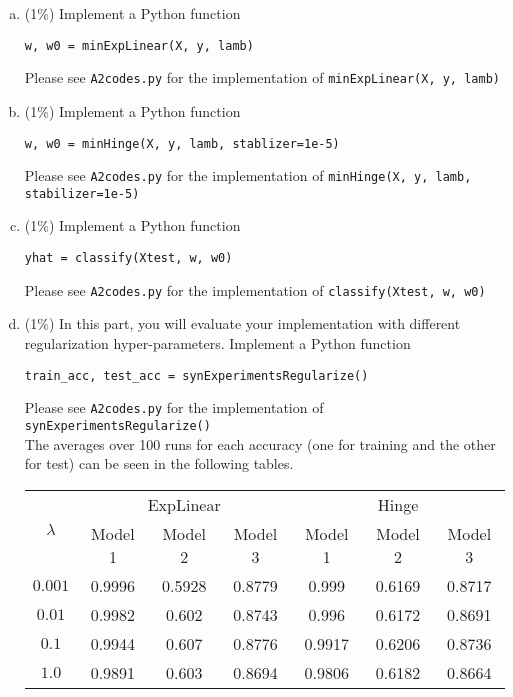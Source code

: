 \documentclass[12pt]{article}
\begin{document}
\begin{enumerate}[(a)]
  \item (1\%) Implement a Python function 
    \begin{center}
      \texttt{w, w0 = minExpLinear(X, y, lamb)}
    \end{center}
    Please see \texttt{A2codes.py} for the implementation of \texttt{minExpLinear(X, y, lamb)}
  \item (1\%) Implement a Python function
    \begin{center}
      \texttt{w, w0 = minHinge(X, y, lamb, stablizer=1e-5)}
    \end{center}
    Please see \texttt{A2codes.py} for the implementation of \texttt{minHinge(X, y, lamb, stabilizer=1e-5)}
  \item (1\%) Implement a Python function 
    \begin{center}
      \texttt{yhat = classify(Xtest, w, w0)}\\
    \end{center}
    Please see \texttt{A2codes.py} for the implementation of \texttt{classify(Xtest, w, w0)}
  \item (1\%) In this part, you will evaluate your implementation with different regularization hyper-parameters. Implement a Python function 
    \begin{center}
      \texttt{train\_acc, test\_acc = synExperimentsRegularize()}
    \end{center}
    Please see \texttt{A2codes.py} for the implementation of \texttt{synExperimentsRegularize()} \\
    The averages over 100 runs for each accuracy (one for training and the other for test) can be seen in the following tables. 
    \begin{table}[H]
      \centering
      \begin{tabular}{|c|c|c|c|c|c|c|}
        \hline
        \multirow{2}{25mm}{\centering$\lambda$} & \multicolumn{3}{|c|}{ExpLinear} & \multicolumn{3}{|c|}{Hinge} \\ 
        \cline{2-7}
        & Model 1 & Model 2 & Model 3 & Model 1 & Model 2 & Model 3 \\ 
        \hline
        $0.001$ & 0.9996 & 0.5928 & 0.8779 & 0.999 & 0.6169 & 0.8717\\ 
        $0.01$ & 0.9982 & 0.602 & 0.8743 & 0.996 & 0.6172 & 0.8691\\ 
        $0.1$ & 0.9944 & 0.607 & 0.8776 & 0.9917 & 0.6206 & 0.8736\\ 
        $1.0$ & 0.9891 & 0.603 & 0.8694 & 0.9806 & 0.6182 & 0.8664\\ 

\end{tabular}
\end{table}
\end{enumerate}
\end{document}
